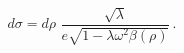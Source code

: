 \begin{equation}
d\sigma = d\rho \,\,\frac{\sqrt{\lambda}}{e \sqrt{1-\lambda\omega^2 \beta(\rho)}}\,.
\end{equation}

